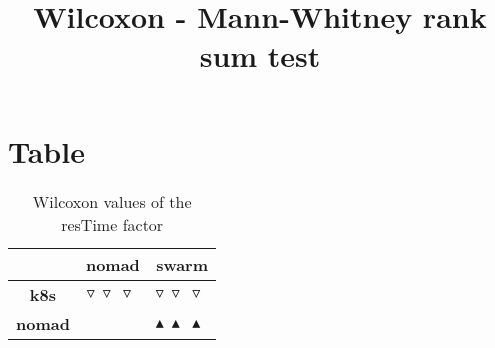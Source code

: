 \documentclass{article}
\title{Wilcoxon - Mann-Whitney rank sum test}
\author{}
\begin{document}
\maketitle
\section{Table}
\begin{table}[!htp]
  \caption{Wilcoxon values of the resTime factor}
  \label{table:resTime}
  \centering
  \begin{scriptsize}
  \begin{tabular}{c|cc}
      & \textbf{nomad} & \textbf{swarm} \\\hline
      \textbf{k8s} & $\triangledown\ \triangledown\ \triangledown\  $ & $ \triangledown\ \triangledown\ \triangledown\ $ \\
      \textbf{nomad} & $ $ & $ \blacktriangle\ \blacktriangle\ \blacktriangle\ $ \\
  \end{tabular}
  \end{scriptsize}
\end{table}
\end{document}
